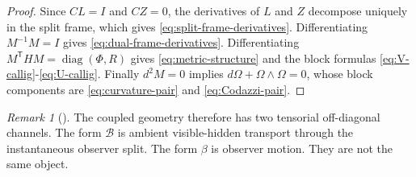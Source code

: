 \documentclass[11pt,a4paper]{article}
\numberwithin{equation}{section}
\DeclareMathOperator{\diag}{diag}
\theoremstyle{thmcompact}
\theoremstyle{remark}
\newtheorem*{remarkplain}{Remark}
\newenvironment{remark}[1][]%
{\begin{remarkbox}\begin{remarkplain}[#1]\normalfont}
{\end{remarkplain}\end{remarkbox}}
\begin{document}
\begin{proof}
Since $CL=I$ and $CZ=0$, the derivatives of $L$ and $Z$ decompose uniquely in the split frame, which gives \eqref{eq:split-frame-derivatives}. Differentiating $M^{-1}M=I$ gives \eqref{eq:dual-frame-derivatives}. Differentiating $M^{\mathsf T}HM=\diag(\Phi,R)$ gives \eqref{eq:metric-structure} and the block formulas \eqref{eq:V-callig}-\eqref{eq:U-callig}. Finally $d^2M=0$ implies $d\Omega+\Omega\wedge\Omega=0$, whose block components are \eqref{eq:curvature-pair} and \eqref{eq:Codazzi-pair}.
\end{proof}

\begin{remark}
The coupled geometry therefore has two tensorial off-diagonal channels. The form $\mathcal B$ is ambient visible-hidden transport through the instantaneous observer split. The form $\beta$ is observer motion. They are not the same object.
\end{remark}
\end{document}
